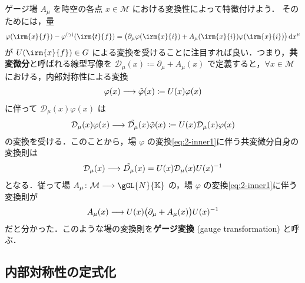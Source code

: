 \documentclass[geometry_main]{subfiles}
\begin{document}
ゲージ場 $A_\mu$ を時空の各点 $x \in \mathcal{M}$ における変換性によって特徴付けよう．
そのためには，量
\begin{align}
    \varphi (\irm{x}{f}) - \varphi^{(\gamma)}(\irm{t}{f}) = \bigl( \partial_\mu \varphi (\irm{x}{i}) + A_\mu(\irm{x}{i}) \varphi (\irm{x}{i}) \bigr) \dd{x}^\mu
\end{align}
が $U(\irm{x}{f}) \in G$ による変換を受けることに注目すれば良い．つまり，\textbf{共変微分}と呼ばれる線型写像を $\mathcal{D}_\mu (x) \coloneqq \partial_\mu + A_\mu (x)$ で定義すると，$\forall x \in \mathcal{M}$ における，内部対称性による変換
\begin{align}
    \label{eq:2-inner1}
    \varphi(x) \longrightarrow \tilde{\varphi}(x) \coloneqq U(x) \varphi (x)
\end{align}
に伴って $\mathcal{D}_\mu (x) \varphi (x)$ は
\begin{align}
    \mathcal{D}_\mu(x) \varphi(x) \longrightarrow \tilde{\mathcal{D}_\mu} (x) \tilde{\varphi}(x) \coloneqq U(x) \mathcal{D}_\mu (x) \varphi(x)
\end{align}
の変換を受ける．このことから，場 $\varphi$ の変換\eqref{eq:2-inner1}に伴う共変微分自身の変換則は
\begin{align}
    \label{eq:def-codv-transform}
    \mathcal{D}_\mu (x) \longrightarrow \tilde{D_\mu} (x) = U(x) \mathcal{D}_\mu (x) U(x)^{-1}
\end{align}
となる．従って場 $A_\mu \colon \mathcal{M} \lto \gGL{N}{\mathbb{K}}$ の，場 $\varphi$ の変換\eqref{eq:2-inner1}に伴う変換則が
\begin{align}
    \label{eq:def-gauge-transform}
    A_\mu (x) \longrightarrow U(x)\bigl(\partial_\mu + A_\mu(x) \bigr) U(x)^{-1}
\end{align}
だと分かった．このような場の変換則を\textbf{ゲージ変換} (gauge transformation) と呼ぶ．
    

\subsection{内部対称性の定式化}
\end{document}

